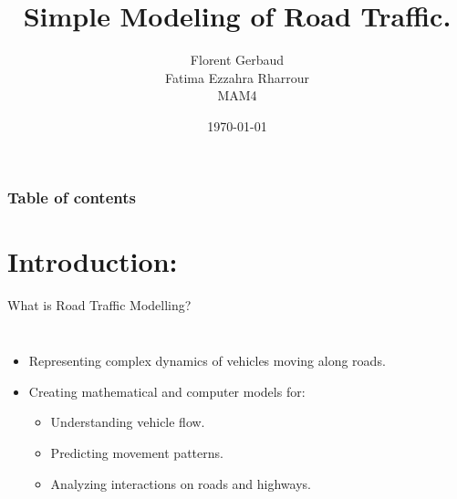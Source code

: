 \documentclass{beamer}
\title[2023-2024]{Simple Modeling of Road Traffic.}
\author{Florent Gerbaud \\ Fatima Ezzahra Rharrour \\ MAM4}
\institute[Polytech Nice-Sophia] %
{
Supervisor: \\ %
\medskip
{Didier Auroux} %
}
\date{\today} %
\begin{document}
\begin{frame}
\titlepage 
\end{frame}

\begin{frame}
\frametitle{Table of contents} 
\tableofcontents
\end{frame}


\section{Introduction:} 
\begin{frame}{What is Road Traffic Modelling?}
	\begin{columns}
		\begin{itemize}
			\item Representing complex dynamics of vehicles moving along roads.
			\item Creating mathematical and computer models for:
			\begin{itemize}
				\item Understanding vehicle flow.
				\item Predicting movement patterns.
				\item Analyzing interactions on roads and highways.
			\end{itemize}
		\end{itemize}
		
		\begin{center}
			\centering
		\end{center}
	\end{columns}
\end{frame}
\end{document}
